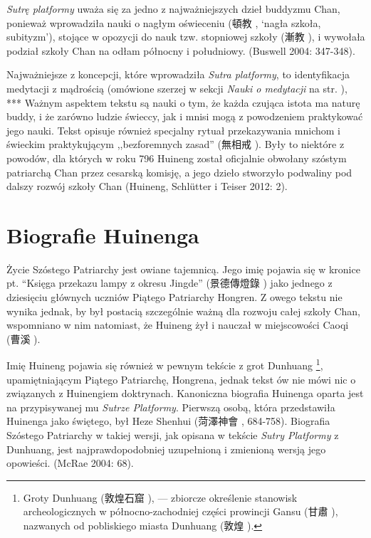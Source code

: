 \textit{Sutrę platformy} uważa się za jedno z najważniejszych dzieł buddyzmu Chan, ponieważ wprowadziła nauki o nagłym oświeceniu (頓教 , `nagła szkoła, subityzm'), stojące w opozycji do nauk tzw. stopniowej szkoły (漸教 ), i wywołała podział szkoły Chan na odłam północny i południowy. %
(Buswell 2004: 347-348).%

Najważniejsze z koncepcji, które wprowadziła \textit{Sutra platformy}, to identyfikacja medytacji z mądrością (omówione szerzej w sekcji \textit{Nauki o medytacji} na str. \pageref{DingHui}), ***
Ważnym aspektem tekstu są nauki o tym, że każda czująca istota ma naturę buddy, i że zarówno ludzie świeccy, jak i mnisi mogą z powodzeniem praktykować jego nauki.
Tekst opisuje również specjalny rytuał przekazywania mnichom i świeckim praktykującym ,,bezforemnych zasad'' (無相戒 ). %
Były to niektóre z powodów, dla których w roku 796 Huineng został oficjalnie obwołany szóstym patriarchą Chan przez cesarską komisję, a jego dzieło stworzyło podwaliny pod dalszy rozwój szkoły Chan
(Huineng, Schlütter i Teiser 2012: 2).


\chapter{Biografie Huinenga}
Życie Szóstego Patriarchy jest owiane tajemnicą. Jego imię pojawia się w kronice pt. ``Księga przekazu lampy z okresu Jingde'' (景德傳燈錄 ) jako jednego z dziesięciu głównych uczniów Piątego Patriarchy Hongren.
Z owego tekstu nie wynika jednak, by był postacią szczególnie ważną dla rozwoju całej szkoły Chan, wspomniano w nim natomiast, że Huineng żył i nauczał w miejscowości Caoqi (曹溪 ).

Imię Huineng pojawia się również w pewnym tekście z grot Dunhuang%
\footnote{Groty Dunhuang (敦煌石窟 ), --- zbiorcze określenie stanowisk archeologicznych w północno-zachodniej części prowincji Gansu (甘肅 ), nazwanych od pobliskiego miasta Dunhuang (敦煌 ).},
upamiętniającym Piątego Patriarchę, Hongrena, jednak tekst ów nie mówi nic o związanych z Huinengiem doktrynach. Kanoniczna biografia Huinenga oparta jest na przypisywanej mu \textit{Sutrze Platformy}. Pierwszą osobą, która przedstawiła Huinenga jako świętego, był Heze Shenhui (菏澤神會 , 684-758). Biografia Szóstego Patriarchy w takiej wersji, jak opisana w tekście \textit{Sutry Platformy} z Dunhuang, jest najprawdopodobniej uzupełnioną i zmienioną wersją jego opowieści. (McRae 2004: 68).

